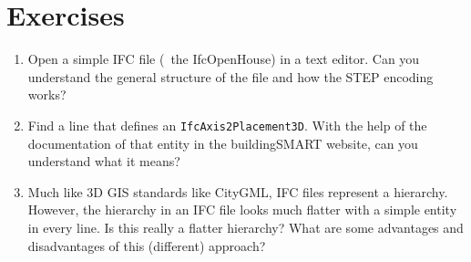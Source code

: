 %

\section{Exercises}

\begin{enumerate}

\item
Open a simple IFC file (\eg\ the IfcOpenHouse) in a text editor.
Can you understand the general structure of the file and how the STEP encoding works? 

\item
Find a line that defines an \texttt{IfcAxis2Placement3D}.
With the help of the documentation of that entity in the buildingSMART website, can you understand what it means?

\item
Much like 3D GIS standards like CityGML, IFC files represent a hierarchy.
However, the hierarchy in an IFC file looks much flatter with a simple entity in every line.
Is this really a flatter hierarchy?
What are some advantages and disadvantages of this (different) approach?

\end{enumerate}
